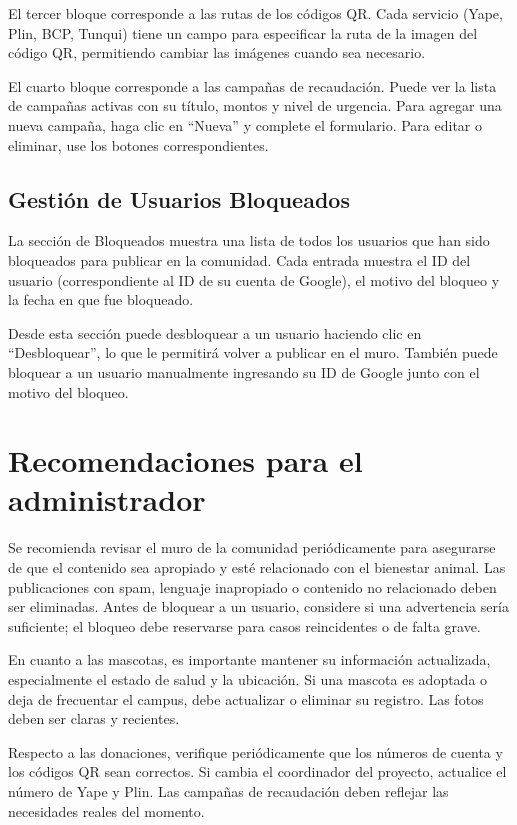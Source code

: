 \documentclass[12pt,a4paper]{article}
\begin{document}
El tercer bloque corresponde a las rutas de los códigos QR. Cada servicio (Yape, Plin, BCP, Tunqui) tiene un campo para especificar la ruta de la imagen del código QR, permitiendo cambiar las imágenes cuando sea necesario.

El cuarto bloque corresponde a las campañas de recaudación. Puede ver la lista de campañas activas con su título, montos y nivel de urgencia. Para agregar una nueva campaña, haga clic en ``Nueva'' y complete el formulario. Para editar o eliminar, use los botones correspondientes.

\subsection{Gestión de Usuarios Bloqueados}

La sección de Bloqueados muestra una lista de todos los usuarios que han sido bloqueados para publicar en la comunidad. Cada entrada muestra el ID del usuario (correspondiente al ID de su cuenta de Google), el motivo del bloqueo y la fecha en que fue bloqueado.

Desde esta sección puede desbloquear a un usuario haciendo clic en ``Desbloquear'', lo que le permitirá volver a publicar en el muro. También puede bloquear a un usuario manualmente ingresando su ID de Google junto con el motivo del bloqueo.

\section{Recomendaciones para el administrador}

Se recomienda revisar el muro de la comunidad periódicamente para asegurarse de que el contenido sea apropiado y esté relacionado con el bienestar animal. Las publicaciones con spam, lenguaje inapropiado o contenido no relacionado deben ser eliminadas. Antes de bloquear a un usuario, considere si una advertencia sería suficiente; el bloqueo debe reservarse para casos reincidentes o de falta grave.

En cuanto a las mascotas, es importante mantener su información actualizada, especialmente el estado de salud y la ubicación. Si una mascota es adoptada o deja de frecuentar el campus, debe actualizar o eliminar su registro. Las fotos deben ser claras y recientes.

Respecto a las donaciones, verifique periódicamente que los números de cuenta y los códigos QR sean correctos. Si cambia el coordinador del proyecto, actualice el número de Yape y Plin. Las campañas de recaudación deben reflejar las necesidades reales del momento.
\end{document}
